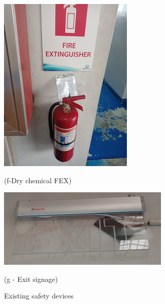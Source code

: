 \begin{figure}[h]
\begin{minipage}[b]{0.22\linewidth}
	\includegraphics[width=\textwidth]{figures/ch04_fig_safety08}
	\caption*{(f-Dry chemical FEX)}
\end{minipage}
	\hspace{0.03cm}
\begin{minipage}[b]{0.5\linewidth}
	\centering
	\includegraphics[width=\textwidth]{figures/ch04_fig_safety09}
	\caption*{(g - Exit signage)}
\end{minipage}
	\caption{Existing safety devices}
	\label{ch04_fig_safety02}
\end{figure}



